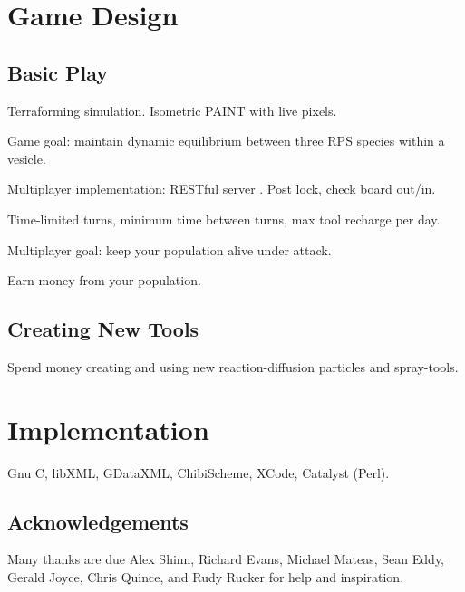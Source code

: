 \documentclass{acm_proc_article-sp}
\begin{document}
\section{Game Design}

\subsection{Basic Play}

Terraforming simulation.
Isometric PAINT with live pixels.

Game goal: maintain dynamic equilibrium between three RPS species within a vesicle.

Multiplayer implementation: RESTful server \cite{rest}.
Post lock, check board out/in.

Time-limited turns, minimum time between turns, max tool recharge per day.

Multiplayer goal: keep your population alive under attack.

Earn money from your population.

\subsection{Creating New Tools}

Spend money creating and using new reaction-diffusion particles and spray-tools.

\section{Implementation}

Gnu C, libXML, GDataXML, ChibiScheme, XCode, Catalyst (Perl).

\subsection{Acknowledgements}

Many thanks are due Alex Shinn, Richard Evans, Michael Mateas, Sean Eddy, Gerald Joyce, Chris Quince,
and Rudy Rucker for help and inspiration.




\balancecolumns
\end{document}
